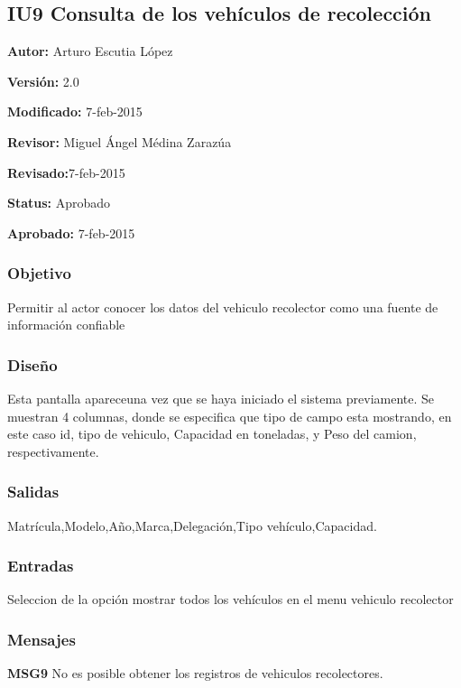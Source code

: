 \subsection{IU9 Consulta de los vehículos de recolección}


\begin{objetivos}
	\item {\bf Autor:} Arturo Escutia López
	\item {\bf Versión:} 2.0
	\item {\bf Modificado:} 7-feb-2015
	\item {\bf Revisor:} Miguel Ángel Médina Zarazúa
	\item {\bf Revisado:}7-feb-2015
	\item {\bf Status:} Aprobado
	\item {\bf Aprobado:} 7-feb-2015
\end{objetivos}

\subsubsection{Objetivo}

	Permitir al actor conocer los datos del vehiculo recolector como una fuente de información confiable

\subsubsection{Diseño}
	Esta pantalla apareceuna vez que se haya iniciado el sistema previamente.
	Se muestran 4 columnas, donde se especifica que tipo de campo esta mostrando, en este caso id, tipo de vehiculo, Capacidad en toneladas, y Peso del camion, respectivamente.
	


\subsubsection{Salidas}

Matrícula,Modelo,Año,Marca,Delegación,Tipo vehículo,Capacidad.

\subsubsection{Entradas}
Seleccion de la opción mostrar todos los vehículos en el menu vehiculo recolector



\subsubsection{Mensajes}
	\begin{Citemize}
		\item {\bf MSG9} No es posible obtener los registros de vehiculos recolectores.
	\end{Citemize}
